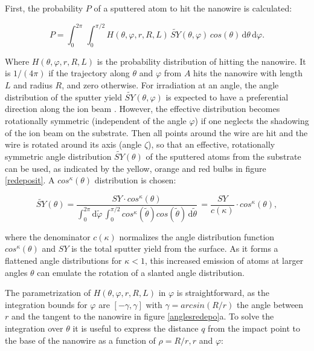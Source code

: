 First, the probability $P$ of a sputtered atom to hit the nanowire is calculated:

\begin{equation}
\label{prob1}
P = \int_0^{2\pi} \! \,\int_0^{\pi/2} \!\! H(\theta,\varphi,r,R,L) \, \tilde{SY}(\theta,\varphi) \,cos(\theta)\,\mathrm{d}\theta \, \mathrm{d}\varphi.
\end{equation}

Where $H(\theta,\varphi,r,R,L)$ is the probability distribution of hitting the nanowire. It is $1/(4\pi)$ if the trajectory along $\theta$ and $\varphi$ from $A$ hits the nanowire with length $L$ and radius $R$, and zero otherwise. For irradiation at an angle, the angle distribution of the sputter yield $\tilde{SY}(\theta,\varphi)$ is expected to have a preferential direction along the ion beam \cite{verdeil_angular_2008}. However, the effective distribution becomes rotationally symmetric (independent of the angle $\varphi$) if one neglects the shadowing of the ion beam on the substrate. Then all points around the wire are hit and the wire is rotated around its axis (angle $\zeta$), so that an effective, rotationally symmetric angle distribution $\tilde{SY}(\theta)$ of the sputtered atoms from the substrate can be used, as indicated by the yellow, orange and red bulbs in figure \ref{redeposit}. A $cos^\kappa(\theta)$ distribution is chosen: 

\begin{equation}
\tilde{SY}(\theta) = \frac{SY \cdot cos^\kappa(\theta)}{\int_0^{2\pi} \! \mathrm{d}\tilde\varphi \,\int_0^{\pi/2} \! cos^\kappa(\tilde\theta) cos(\tilde\theta)\,  \mathrm{d}\tilde\theta} \, = \frac{SY}{c(\kappa)} \cdot cos^\kappa(\theta) ,
\end{equation}

where the denominator $c(\kappa)$ normalizes the angle distribution function $cos^\kappa(\theta)$ and $SY$ is the total sputter yield from the surface. As it forms a flattened angle distributions for $\kappa < 1$, this increased emission of atoms at larger angles $\theta$ can emulate the rotation of a slanted angle distribution.

The parametrization of $H(\theta,\varphi,r,R,L)$ in $\varphi$ is straightforward, as the integration bounds for $\varphi$ are $[-\gamma, \gamma]$ with $\gamma = arcsin(R/r)$ the angle between $r$ and the tangent to the nanowire in figure \ref{anglesredepo}a. To solve the integration over $\theta$ it is useful to express the distance $q$ from the impact point to the base of the nanowire as a function of $\rho = R/r, r$ and $\varphi$:

